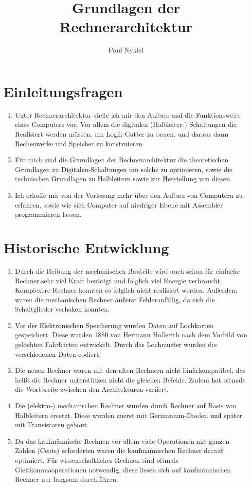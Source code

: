 \documentclass[DIN, pagenumber=false, fontsize=11pt, parskip=half]{scrartcl}
\title{Grundlagen der Rechnerarchitektur}
\author{Paul Nykiel}
\begin{document}
    \maketitle
    \section{Einleitungsfragen}
    \begin{enumerate}[label=(\alph*)]
            \item Unter Rechnerarchitektur stelle ich mir den Aufbau und die Funktionsweise eines Computers vor. Vor allem die digitalen (Halbleiter-) Schaltungen die Realisiert werden müssen, um Logik-Gatter zu bauen, und daraus dann Rechenwerke und Speicher zu konstruieren.
            \item Für mich sind die Grundlagen der Rechnerarchitektur die theoretischen Grundlagen zu Digitalen-Schaltungen um solche zu optimieren, sowie die technischen Grundlagen zu Halbleitern sowie zur Herstellung von diesen.
            \item Ich erhoffe mir von der Vorlesung mehr über den Aufbau von Computern zu erfahren, sowie wie sich Computer auf niedriger Ebene mit Assembler programmieren lassen.
    \end{enumerate}

    \section{Historische Entwicklung}
    \begin{enumerate}[label=(\alph*)]
        \item Durch die Reibung der mechanischen Bauteile wird auch schon für einfache Rechner sehr viel Kraft benötigt und folglich viel Energie verbraucht.
            Komplexere Rechner konnten so folglich nicht realisiert werden. Außerdem waren die mechanischen Rechner äußerst Fehleranfällig, da sich die 
            Schaltglieder verhaken konnten.
        \item Vor der Elektronischen Speicherung wurden Daten auf Lochkarten gespeichert. Diese wurden 1880 von Hermann Hollerith nach dem Vorbild von
            gelochten Fahrkarten entwickelt. Durch das Lochmuster wurden die verschiedenen Daten codiert.
        \item Die neuen Rechner waren mit den alten Rechnern nicht binärkompatibel, das heißt die Rechner unterstützen nicht die gleichen Befehle.
            Zudem hat oftmals die Wortbreite zwischen den Architekturen variiert.
        \item Die (elektro-) mechanischen Rechner wurden durch Rechner auf Basis von Halbleitern ersetzt. Diese wurden zuerst mit Germanium-Dioden und später mit
            Transistoren gebaut.
        \item Da das kaufmännische Rechnen vor allem viele Operationen mit ganzen Zahlen (Cents)  erforderten waren die kaufmännischen Rechner darauf optimiert.
            Für wissenschaftliches Rechnen sind oftmals Gleitkommaoperationen notwendig, diese liesen sich auf kaufmännischen Rechner nur langsam durchführen.
    \end{enumerate}
\end{document}
